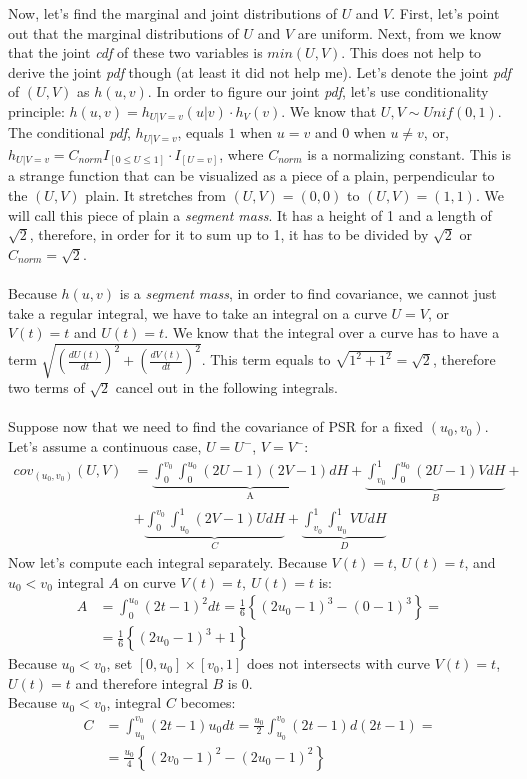 \documentclass[]{article}
\begin{document}
Now, let's find the marginal and joint distributions of $U$ and $V$. First, let's point out that the marginal distributions of $U$ and $V$ are uniform. Next, from \cite{nelsen2007introduction} we know that the joint \emph{cdf} of these two variables is $min(U, V)$. This does not help to derive the joint \emph{pdf} though (at least it did not help me). Let's denote the joint \emph{pdf} of $(U, V)$ as $h(u, v)$. In order to figure our joint \emph{pdf}, let's use conditionality principle: $h(u, v)=h_{U|V=v}(u|v)\cdot h_V(v)$. We know that $U,V \sim Unif(0, 1)$. The conditional \emph{pdf}, $h_{U|V=v}$, equals $1$ when $u=v$ and $0$ when $u\neq v$, or, $h_{U|V=v} = C_{norm}I_{[0\leq U \leq 1]}\cdot I_{[U=v]}$, where $C_{norm}$ is a normalizing constant. This is a strange function that can be visualized as a piece of a plain, perpendicular to the $(U,V)$ plain. It stretches from $(U,V) = (0, 0)$ to $(U,V) = (1,1)$. We will call this piece of plain a \emph{segment mass}. It has a height of 1 and a length of $\sqrt{2}$, therefore, in order for it to sum up to 1, it has to be divided by $\sqrt{2}$ or $C_{norm}=\sqrt{2}$.\\
~\\
Because $h(u, v)$ is a \emph{segment mass}, in order to find covariance, we cannot just take a regular integral, we have to take an integral on a curve $U=V$, or $V(t)=t$ and $U(t) = t$. We know that the integral over a curve has to have a term $\sqrt{\left(\frac{dU(t)}{dt}\right)^2 + \left(\frac{dV(t)}{dt}\right)^2}$. This term equals to $\sqrt{1^2 + 1^2} = \sqrt{2}$, therefore two terms of $\sqrt{2}$ cancel out in the following integrals.\\
~\\
Suppose now that we need to find the covariance of PSR for a fixed $(u_0, v_0)$. Let's assume a continuous case, $U = U^-$, $V = V^-$:
	$$
	\begin{aligned}
    cov_{(u_0, v_0)}(U, V) &= \underbrace{\int_0^{v_0}\int_0^{u_0} (2U - 1)(2V - 1)dH}_{\text{A}} + \underbrace{\int_{v_0}^{1}\int_0^{u_0} (2U - 1)VdH}_{B} + \\
    &+\underbrace{\int_{0}^{v_0}\int_{u_0}^1 (2V - 1)UdH}_{C} + \underbrace{\int_{v_0}^{1}\int_{u_0}^1 VUdH}_{D}
	\end{aligned}
	$$
Now let's compute each integral separately. Because $V(t)=t$, $U(t) = t$, and $u_0 < v_0$ integral $A$ on curve $V(t)=t,~U(t) = t$ is:
	$$
	\begin{aligned}
    A &= \int_0^{u_0} (2t - 1)^2 dt = \frac{1}{6}\left\{  (2u_0 - 1)^3 - (0-1)^3\right\}=\\
     &= \frac{1}{6}\left\{  (2u_0 - 1)^3 + 1\right\}
	\end{aligned}
	$$
Because $u_0 < v_0$, set $[0, u_0]\times [v_0, 1]$ does not intersects with curve $V(t)=t$, $U(t) = t$ and therefore integral $B$ is 0.\\
Because $u_0 < v_0$,  integral $C$ becomes:
	$$
	\begin{aligned}
    C &= \int_{u_0}^{v_0} (2t - 1)u_0 dt = \frac{u_0}{2} \int_{u_0}^{v_0}  (2t - 1) d(2t - 1) = \\
    &= \frac{u_0}{4}\left\{  (2v_0 - 1)^2 -(2u_0 - 1)^2 \right\}
	\end{aligned}
	$$
\end{document}
